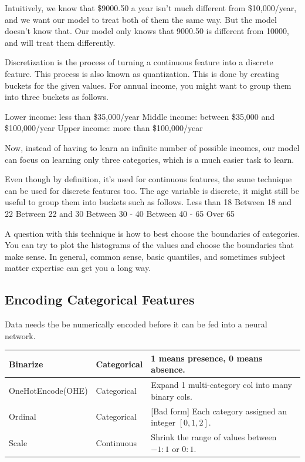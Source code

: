 \documentclass[openany]{book}
\begin{document}
Intuitively, we know that  \$9000.50 a year isn’t much different from \$10,000/year, and we want our model to treat both of them the same way. But the model doesn’t know that. Our model only knows that 9000.50 is different from 10000, and will treat them differently.

Discretization is the process of turning a continuous feature into a discrete feature. This process is also known as quantization. This is done by creating buckets for the given values. For annual income, you might want to group them into three buckets as follows.

Lower income: less than \$35,000/year
Middle income: between \$35,000 and \$100,000/year
Upper income: more than \$100,000/year

Now, instead of having to learn an infinite number of possible incomes, our model can focus on learning only three categories, which is a much easier task to learn.

Even though by definition, it’s used for continuous features, the same technique can be used for discrete features too. The age variable is discrete, it might still be useful to group them into buckets such as follows.
Less than 18
Between 18 and 22
Between 22 and 30
Between 30 - 40
Between 40 - 65
Over 65

A question with this technique is how to best choose the boundaries of categories. You can try to plot the histograms of the values and choose the boundaries that make sense. In general, common sense, basic quantiles, and sometimes subject matter expertise can get you a long way.


\subsection{Encoding Categorical Features}

Data needs the be numerically encoded before it can be fed into a neural network.


\begin{tabular}{|l|l|l|}
\hline Binarize & Categorical & 1 means presence, 0 means absence. \\
\hline OneHotEncode(OHE) & Categorical & Expand 1 multi-category col into many binary cols. \\
\hline Ordinal & Categorical & [Bad form] Each category assigned an integer $[0,1,2]$. \\
\hline Scale & Continuous & Shrink the range of values between $-1: 1$ or $0: 1$. \\
\hline
\end{tabular}
\end{document}
